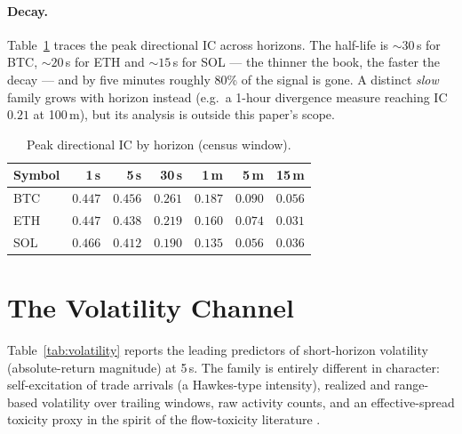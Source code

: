 \documentclass[11pt,a4paper]{article}
\theoremstyle{definition}
\theoremstyle{plain}
\newcommand{\toprule}{\hline\hline}
\newcommand{\midrule}{\hline}
\newcommand{\bottomrule}{\hline\hline}
\begin{document}
\paragraph{Decay.} Table~\ref{tab:decay} traces the peak directional
IC across horizons. The half-life is ${\sim}30$\,s for BTC,
${\sim}20$\,s for ETH and ${\sim}15$\,s for SOL --- the thinner the
book, the faster the decay --- and by five minutes roughly 80\% of the
signal is gone. A distinct \emph{slow} family grows with horizon
instead (e.g.\ a 1-hour divergence measure reaching IC $0.21$ at
100\,m), but its analysis is outside this paper's scope.

\begin{table}[htbp]
\centering
\small
\caption{Peak directional IC by horizon (census window).}
\label{tab:decay}
\begin{tabular}{lrrrrrr}
\toprule
Symbol & 1\,s & 5\,s & 30\,s & 1\,m & 5\,m & 15\,m \\
\midrule
BTC & $0.447$ & $0.456$ & $0.261$ & $0.187$ & $0.090$ & $0.056$ \\
ETH & $0.447$ & $0.438$ & $0.219$ & $0.160$ & $0.074$ & $0.031$ \\
SOL & $0.466$ & $0.412$ & $0.190$ & $0.135$ & $0.056$ & $0.036$ \\
\bottomrule
\end{tabular}
\end{table}

\section{The Volatility Channel}\label{sec:volatility}

Table~\ref{tab:volatility} reports the leading predictors of
short-horizon volatility (absolute-return magnitude) at 5\,s. The
family is entirely different in character: self-excitation of trade
arrivals (a Hawkes-type intensity), realized and range-based
volatility over trailing windows, raw activity counts, and an
effective-spread toxicity proxy in the spirit of the flow-toxicity
literature \citep{easley2012}.
\end{document}
